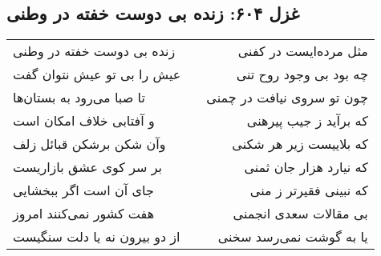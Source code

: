 \begin{center}
\section*{غزل ۶۰۴: زنده بی دوست خفته در وطنی}
\label{sec:604}
\begin{longtable}{l p{0.5cm} r}
زنده بی دوست خفته در وطنی
&&
مثل مرده‌ایست در کفنی
\\
عیش را بی تو عیش نتوان گفت
&&
چه بود بی وجود روح تنی
\\
تا صبا می‌رود به بستان‌ها
&&
چون تو سروی نیافت در چمنی
\\
و آفتابی خلاف امکان است
&&
که برآید ز جیب پیرهنی
\\
وآن شکن برشکن قبائل زلف
&&
که بلاییست زیر هر شکنی
\\
بر سر کوی عشق بازاریست
&&
که نیارد هزار جان ثمنی
\\
جای آن است اگر ببخشایی
&&
که نبینی فقیرتر ز منی
\\
هفت کشور نمی‌کنند امروز
&&
بی مقالات سعدی انجمنی
\\
از دو بیرون نه یا دلت سنگیست
&&
یا به گوشت نمی‌رسد سخنی
\\
\end{longtable}
\end{center}
